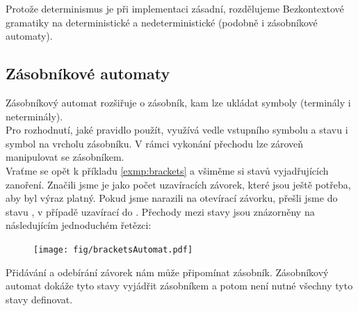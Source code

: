 Protože determinismus je při implementaci zásadní, rozdělujeme Bezkontextové gramatiky
na deterministické a nedeterministické (podobně i zásobníkové automaty).\\


\subsection{Zásobníkové automaty}

Zásobníkový automat rozšiřuje  o zásobník, kam lze
ukládat symboly (terminály i neterminály).\\

Pro rozhodnutí, jaké pravidlo použít,
využívá vedle vstupního symbolu a stavu i symbol na vrcholu zásobníku. V rámci vykonání
přechodu lze zároveň manipulovat se zásobníkem.\\

Vraťme se opět k příkladu \ref{exmp:brackets} a všiměme si stavů
vyjadřujících zanoření. Značili jsme je jako počet uzavíracích závorek,
které jsou ještě potřeba, aby byl výraz platný. Pokud jsme narazili na
otevírací závorku, přešli jsme do stavu , v případě uzavírací
do . Přechody mezi stavy jsou znázorněny na
následujícím jednoduchém řetězci:

\begin{figure}[H]
  \centering
  \texttt{[image: fig/bracketsAutomat.pdf]}
\end{figure}

Přidávání a odebírání závorek nám může připomínat zásobník.
Zásobníkový automat dokáže tyto stavy vyjádřit zásobníkem a potom
není nutné všechny tyto stavy definovat.\\

